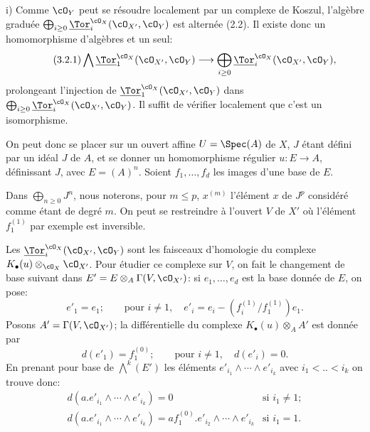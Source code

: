 i)
Comme \(\cO_Y\) peut se résoudre localement par un complexe de Koszul, l'algèbre graduée \(\bigoplus_{i\ge0}\underline{\Tor}_i^{\cO_X}(\cO_{X'},\cO_Y)\) est alternée (2.2). Il existe donc un homomorphisme d'algèbres et un seul:
\begin{equation}\tag{3.2.1}
\bigwedge \underline{\Tor}_1^{\cO_X}(\cO_{X'},\cO_Y)
\longrightarrow
\bigoplus_{i\ge0}\underline{\Tor}_i^{\cO_X}(\cO_{X'},\cO_Y),
\end{equation}
prolongeant l'injection de \(\underline{\Tor}_1^{\cO_X}(\cO_{X'},\cO_Y)\) dans
\(\bigoplus_{i\ge0}\underline{\Tor}_i^{\cO_X}(\cO_{X'},\cO_Y)\). Il suffit de vérifier localement que c'est un isomorphisme.

On peut donc se placer sur un ouvert affine \(U=\Spec(A)\) de \(X\), \(J\) étant défini par un idéal \(J\) de \(A\), et se donner un homomorphisme régulier \(u:E\to A\), définissant \(J\), avec \(E=(A)^n\). Soient \(f_1,\ldots,f_d\) les images d'une base de \(E\).

Dans \(\bigoplus_{n\ge0}J^n\), nous noterons, pour \(m\le p\), \(x^{(m)}\) l'élément \(x\) de \(J^p\) considéré comme étant de degré \(m\). On peut se restreindre à l'ouvert \(V\) de \(X'\) où l'élément \(f_1^{(1)}\) par exemple est inversible.

Les \(\underline{\Tor}_i^{\cO_X}(\cO_{X'},\cO_Y)\) sont les faisceaux d'homologie du complexe \(K_\bullet(u)\otimes_{\cO_X}\cO_{X'}\). Pour étudier ce complexe sur \(V\), on fait le changement de base suivant dans \(E'=E\otimes_A\Gamma(V,\cO_{X'})\): si \(e_1,\ldots,e_d\) est la base donnée de \(E\), on pose:
\[
e'_1=e_1;\qquad \text{pour }i\ne1,\quad
e'_i=e_i-(f_i^{(1)}/f_1^{(1)})e_1.
\]
Posons \(A'=\Gamma(V,\cO_{X'})\); la différentielle du complexe \(K_\bullet(u)\otimes_A A'\) est donnée par
\[
d(e'_1)=f_1^{(0)};\qquad \text{pour }i\ne1,\quad d(e'_i)=0.
\]
En prenant pour base de \(\bigwedge^k(E')\) les éléments
\(e'_{i_1}\wedge\cdots\wedge e'_{i_k}\) avec \(i_1<..<i_k\) on trouve donc:
\[
\begin{array}{ll}
d(a.e'_{i_1}\wedge\cdots\wedge e'_{i_k})=0
&\text{si }i_1\ne1;\\[3pt]
d(a.e'_{i_1}\wedge\cdots\wedge e'_{i_k})=
af_1^{(0)}.e'_{i_2}\wedge\cdots\wedge e'_{i_k}
&\text{si }i_1=1.
\end{array}
\]
